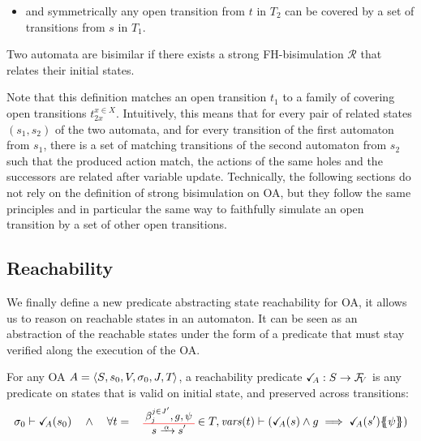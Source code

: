 \documentclass[runningheads]{llncs}
\begin{document}
\begin{definition}
\begin{itemize}
     
 \item  and symmetrically any open transition from $t$ in ${T}_2$ can be 
      covered by a set of transitions from $s$ in ${T}_1$.
 \end{itemize}

Two automata are bisimilar if there exists a strong FH-bisimulation $ \mathcal{R}$ that relates their initial states.

 

 \end{definition}
Note that this definition matches an open transition $t_1$ to a family of covering open transitions $t_{2x}^{x\in X}$.
Intuitively, this means that for every pair of related
states $(s_1,s_2)$  of the two automata, and for every  transition of the first automaton from $s_1$, there is a set of matching transitions  of the second automaton  from $s_2$ such that the produced action match, the actions of the same holes and the successors are related after variable update.
Technically, the following sections do not rely on the definition of strong bisimulation on OA, but they follow the same principles and in particular the same way to faithfully simulate an open transition by a set of other open transitions.

\subsection{Reachability}
We finally define a new predicate abstracting state reachability for OA, it  allows us to reason on reachable states in an automaton. It can  be seen as an abstraction of the reachable states under the form of a predicate that must stay verified along the execution of the OA.
\begin{definition}[Reachability] \label{Def:Reach}
For any OA \(A = \OAg\), a reachability predicate \(\reach{A}: S \to \rformulas[V]\) is any predicate on states that is valid on initial state, and preserved across transitions:
\[\sigma_0 \vdash \reach{A}\mpar{s_0}\quad\land\quad\forall t = \OTg \in T, \fvars{t} \vdash \left(\reach{A}\mpar{s} \wedge g \implies \reach{A}\mpar{s'}\psubst{\psi}\right)\]
\end{definition}
\end{document}

